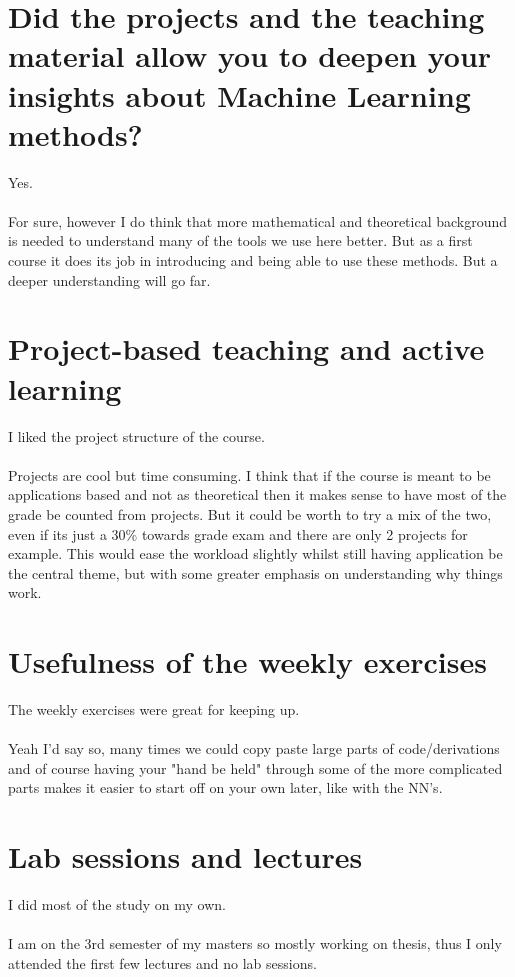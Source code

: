 \documentclass[12pt]{article}
\begin{document}
	\vspace{2cm}
	
	\section*{Did the projects and the teaching material allow you to deepen your insights about Machine Learning methods?}
	Yes.
	\\\\
	For sure, however I do think that more mathematical and theoretical background is needed to understand many of the tools we use here better. But as a first course it does its job in introducing and being able to use these methods. But a deeper understanding will go far.
	
	\vspace{2cm}
	
	\section*{Project-based teaching and active learning}
	\noindent
	I liked the project structure of the course.
	\\\\
	Projects are cool but time consuming. I think that if the course is meant to be applications based and not as theoretical then it makes sense to have most of the grade be counted from projects. But it could be worth to try a mix of the two, even if its just a 30\% towards grade exam and there are only 2 projects for example. This would ease the workload slightly whilst still having application be the central theme, but with some greater emphasis on understanding why things work.

	
	\vspace{2cm}
	
	\section*{Usefulness of the weekly exercises}
	\noindent
	The weekly exercises were great for keeping up. 
	\\\\
	Yeah I'd say so, many times we could copy paste large parts of code/derivations and of course having your "hand be held" through some of the more complicated parts makes it easier to start off on your own later, like with the NN's.
	\vspace{2cm}
	
	\section*{Lab sessions and lectures}
	\noindent
	I did most of the study on my own. 
	\\\\
	I am on the 3rd semester of my masters so mostly working on thesis, thus I only attended the first few lectures and no lab sessions.
	
\end{document}
